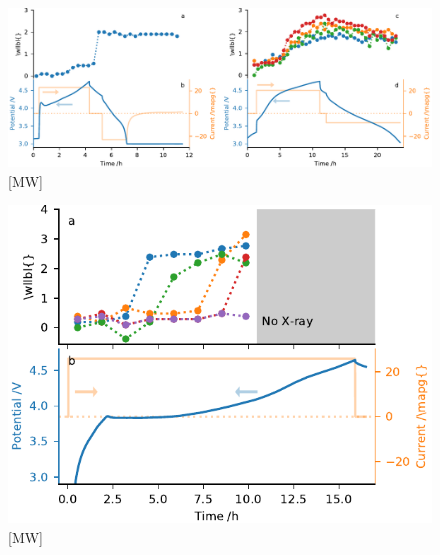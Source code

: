 \documentclass{article}
\begin{document}
\begin{figure}
  \includegraphics{figures/NCA-particle-echem.pdf}
  \caption{[MW]}
  \label{fig:nca-particles}
\end{figure}

\begin{figure}
  \includegraphics{figures/NMC532-particle-echem.pdf}
  \caption{[MW]}
  \label{fig:nmc532-particles}
\end{figure}
\end{document}
